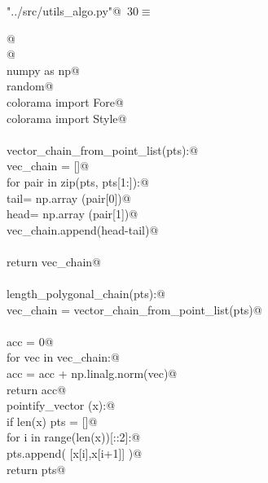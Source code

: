 \documentclass[10.0pt]{report}
\begin{document}
\begin{appendices}
\begin{flushleft} \small\label{scrap13}\raggedright\small
{} \verb@"../src/utils_algo.py"@\nobreak\ {\footnotesize {30}}$\equiv$
\vspace{-1ex}
\begin{list}{}{} \item
\mbox{}\verb@    @\\
\mbox{}\verb@ @\\
\mbox{}\verb@import numpy as np@\\
\mbox{}\verb@import random@\\
\mbox{}\verb@from colorama import Fore@\\
\mbox{}\verb@from colorama import Style@\\
\mbox{}\verb@@\\
\mbox{}\verb@def vector_chain_from_point_list(pts):@\\
\mbox{}\verb@    vec_chain = []@\\
\mbox{}\verb@    for pair in zip(pts, pts[1:]):@\\
\mbox{}\verb@        tail= np.array (pair[0])@\\
\mbox{}\verb@        head= np.array (pair[1])@\\
\mbox{}\verb@        vec_chain.append(head-tail)@\\
\mbox{}\verb@@\\
\mbox{}\verb@    return vec_chain@\\
\mbox{}\verb@@\\
\mbox{}\verb@def length_polygonal_chain(pts):@\\
\mbox{}\verb@    vec_chain = vector_chain_from_point_list(pts)@\\
\mbox{}\verb@@\\
\mbox{}\verb@    acc = 0@\\
\mbox{}\verb@    for vec in vec_chain:@\\
\mbox{}\verb@        acc = acc + np.linalg.norm(vec)@\\
\mbox{}\verb@    return acc@\\
\mbox{}\verb@def pointify_vector (x):@\\
\mbox{}\verb@    if len(x) % 2 == 0:@\\
\mbox{}\verb@        pts = []@\\
\mbox{}\verb@        for i in range(len(x))[::2]:@\\
\mbox{}\verb@            pts.append( [x[i],x[i+1]] )@\\
\mbox{}\verb@        return pts@\\

\end{list}
\end{flushleft}
\end{appendices}
\end{document}
